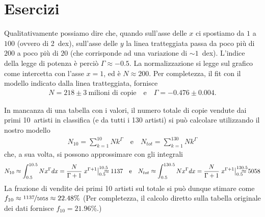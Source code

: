 
\chapter{Esercizi}


Qualitativamente possiamo dire che, quando sull'asse delle $x$ ci spostiamo da
$1$ a $100$ (ovvero di 2~dex), sull'asse delle $y$ la linea tratteggiata passa
da poco più di $200$ a poco più di $20$ (che corrisponde ad una variazione
di $\sim 1$~dex). L'indice della legge di potenza è perciò $\Gamma \approx -0.5$.
La normalizzazione si legge sul grafico come intercetta con l'asse $x = 1$,
ed è $N \approx 200$. Per completezza, il fit con il modello indicato dalla
linea tratteggiata, fornisce
\begin{align*}
  N = 218 \pm 3~\text{milioni di copie} \quad \text{e} \quad \Gamma = -0.476 \pm 0.004.
\end{align*}

In mancanza di una tabella con i valori, il numero totale di copie vendute dai
primi 10~artisti in classifica (e da tutti i 130 artisti) si può calcolare
utilizzando il nostro modello
\begin{align*}
  N_{10} = \sum_{k=1}^{10} N k^\Gamma \quad \text{e} \quad N_{tot} = \sum_{k=1}^{130} N k^\Gamma
\end{align*}
che, a sua volta, si possono approssimare con gli integrali
\begin{align*}
  N_{10} \approx \int_{0.5}^{10.5} N x^\Gamma dx =
  \frac{N}{\Gamma + 1} \eval{x^{\Gamma + 1}}{0.5}{10.5} \;\; \approx 1137
  \quad \text{e} \quad
  N_{tot} \approx \int_{0.5}^{130.5} N x^\Gamma dx =
  \frac{N}{\Gamma + 1} \eval{x^{\Gamma + 1}}{0.5}{130.5} \;\; \approx 5058
\end{align*}
La frazione di vendite dei primi 10 artisti sul totale si può dunque stimare
come $f_{10} \approx \nicefrac{1137}{5058} \approx 22.48\%$
(Per completezza, il calcolo diretto sulla tabella originale dei dati fornisce
$f_{10} = 21.96\%$.)


